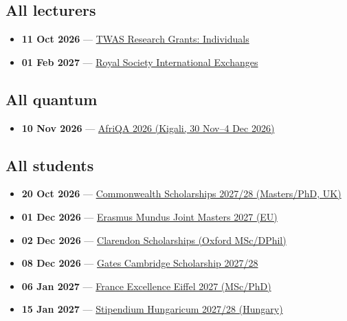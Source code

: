 \subsection*{All lecturers}
\begin{itemize}[leftmargin=1.4em,itemsep=0.1em]
  \item \textbf{11 Oct 2026} --- \href{https://www.twas.org/index%2ephp/opportunity/twas-research-grants-programme-basic-sciences-individuals}{TWAS Research Grants: Individuals}
  \item \textbf{01 Feb 2027} --- \href{https://royalsociety.org/grants/international-exchanges}{Royal Society International Exchanges}
\end{itemize}

\subsection*{All quantum}
\begin{itemize}[leftmargin=1.4em,itemsep=0.1em]
  \item \textbf{10 Nov 2026} --- \href{https://afriqa.aimsric.org/}{AfriQA 2026 (Kigali, 30 Nov--4 Dec 2026)}
\end{itemize}

\subsection*{All students}
\begin{itemize}[leftmargin=1.4em,itemsep=0.1em]
  \item \textbf{20 Oct 2026} --- \href{https://cscuk.fcdo.gov.uk/scholarships}{Commonwealth Scholarships 2027/28 (Masters/PhD, UK)}
  \item \textbf{01 Dec 2026} --- \href{https://erasmus-plus.ec.europa.eu/opportunities/individuals/students/erasmus-mundus-joint-masters}{Erasmus Mundus Joint Masters 2027 (EU)}
  \item \textbf{02 Dec 2026} --- \href{https://www.ox.ac.uk/admissions/graduate/fees-and-funding/funding/clarendon}{Clarendon Scholarships (Oxford MSc/DPhil)}
  \item \textbf{08 Dec 2026} --- \href{https://www.gatescambridge.org/apply/timeline/}{Gates Cambridge Scholarship 2027/28}
  \item \textbf{06 Jan 2027} --- \href{https://www.campusfrance.org/en/france-excellence-eiffel-scholarship-program}{France Excellence Eiffel 2027 (MSc/PhD)}
  \item \textbf{15 Jan 2027} --- \href{https://stipendiumhungaricum.hu/}{Stipendium Hungaricum 2027/28 (Hungary)}
\end{itemize}

